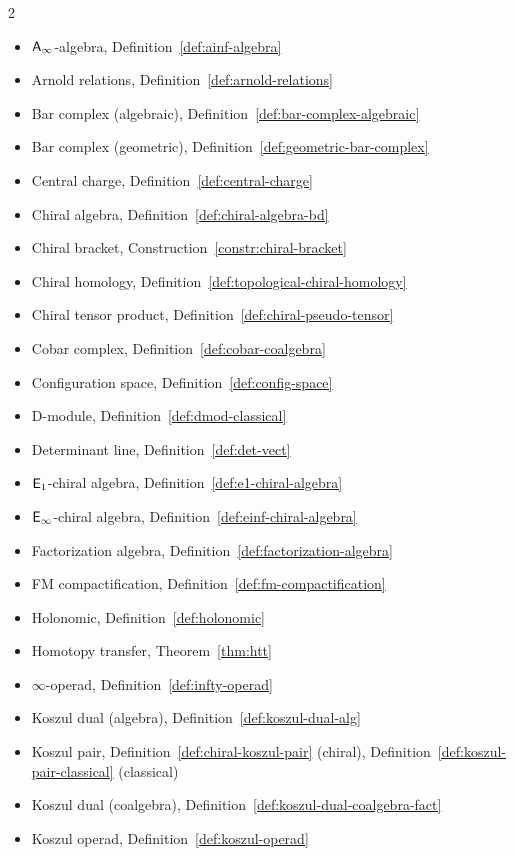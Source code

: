 \begin{multicols}{2}
\begin{itemize}[leftmargin=*, itemsep=0pt]
\item $\mathsf{A}_{\infty}$-algebra, Definition~\ref{def:ainf-algebra}
\item Arnold relations, Definition~\ref{def:arnold-relations}
\item Bar complex (algebraic), Definition~\ref{def:bar-complex-algebraic}
\item Bar complex (geometric), Definition~\ref{def:geometric-bar-complex}
\item Central charge, Definition~\ref{def:central-charge}
\item Chiral algebra, Definition~\ref{def:chiral-algebra-bd}
\item Chiral bracket, Construction~\ref{constr:chiral-bracket}
\item Chiral homology, Definition~\ref{def:topological-chiral-homology}
\item Chiral tensor product, Definition~\ref{def:chiral-pseudo-tensor}
\item Cobar complex, Definition~\ref{def:cobar-coalgebra}
\item Configuration space, Definition~\ref{def:config-space}
\item D-module, Definition~\ref{def:dmod-classical}
\item Determinant line, Definition~\ref{def:det-vect}
\item $\mathsf{E}_1$-chiral algebra, Definition~\ref{def:e1-chiral-algebra}
\item $\mathsf{E}_{\infty}$-chiral algebra, Definition~\ref{def:einf-chiral-algebra}
\item Factorization algebra, Definition~\ref{def:factorization-algebra}
\item FM compactification, Definition~\ref{def:fm-compactification}
\item Holonomic, Definition~\ref{def:holonomic}
\item Homotopy transfer, Theorem~\ref{thm:htt}
\item $\infty$-operad, Definition~\ref{def:infty-operad}
\item Koszul dual (algebra), Definition~\ref{def:koszul-dual-alg}
\item Koszul pair, Definition~\ref{def:chiral-koszul-pair} (chiral), Definition~\ref{def:koszul-pair-classical} (classical)
\item Koszul dual (coalgebra), Definition~\ref{def:koszul-dual-coalgebra-fact}
\item Koszul operad, Definition~\ref{def:koszul-operad}

\end{itemize}
\end{multicols}
